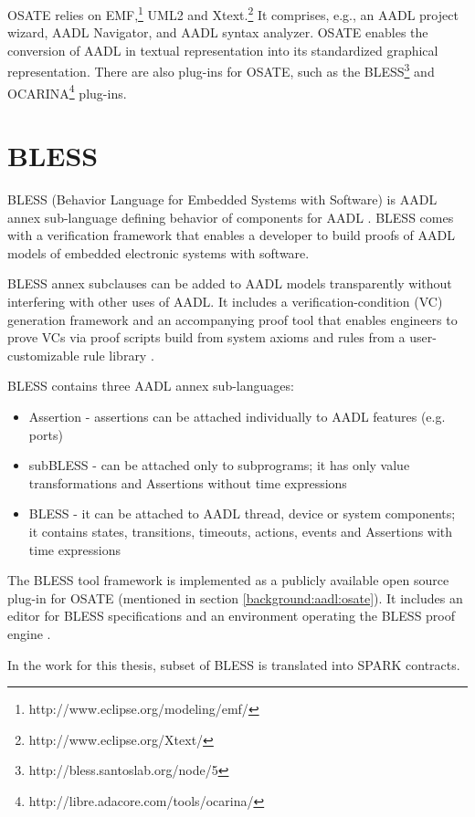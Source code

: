OSATE relies on EMF,\footnote{http://www.eclipse.org/modeling/emf/} UML2 and Xtext.\footnote{http://www.eclipse.org/Xtext/} It comprises, e.g., an AADL project wizard, AADL Navigator, and AADL syntax analyzer. OSATE enables the conversion of AADL in textual representation into its standardized graphical representation. There are also plug-ins for OSATE, such as the BLESS\footnote{http://bless.santoslab.org/node/5} and OCARINA\footnote{http://libre.adacore.com/tools/ocarina/} plug-ins.



\section{BLESS}
\label{background:bless}
BLESS (Behavior Language for Embedded Systems with Software) is AADL annex sub-language defining behavior of components for AADL \cite{Bless:Paper}. BLESS comes with a verification framework that enables a developer to build proofs of AADL models of embedded electronic systems with software.

BLESS annex subclauses can be added to AADL models transparently without interfering with other uses of AADL. It includes a verification-condition (VC) generation framework and an accompanying proof tool that enables engineers to prove VCs via proof scripts build from system axioms and rules from a user-customizable rule library \cite{Bless:Paper}.

BLESS contains three AADL annex sub-languages:
\begin{itemize} \itemsep1pt \parskip0pt 
	\item Assertion - assertions can be attached individually to AADL features (e.g. ports)
	\item subBLESS - can be attached only to subprograms; it has only value transformations and Assertions without time expressions
	\item BLESS - it can be attached to AADL thread, device or system components; it contains states, transitions, timeouts, actions, events and Assertions with time expressions
\end{itemize}

The BLESS tool framework is implemented as a publicly available open source plug-in for OSATE (mentioned in section \ref{background:aadl:osate}). It includes an editor for BLESS specifications and an environment operating the BLESS proof engine \cite{Bless:Paper}.

In the work for this thesis, subset of BLESS is translated into SPARK contracts.



